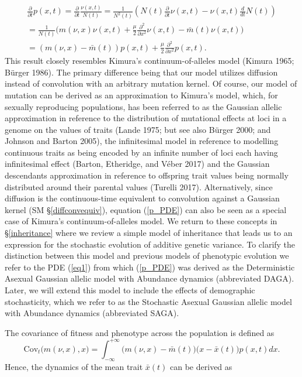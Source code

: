 \documentclass[]{article}
\begin{document}
\begin{multline}\label{p_PDE}
\frac{\partial}{\partial t}p(x,t)=\frac{\partial}{\partial t}\frac{\nu(x,t)}{N(t)}=\frac{1}{N^2(t)}\left(N(t)\frac{\partial}{\partial t}\nu(x,t)-\nu(x,t)\frac{d}{dt}N(t)\right) \\
=\frac{1}{N(t)}\Big(m(\nu,x)\nu(x,t)+\frac{\mu}{2}\frac{\partial^2}{\partial x^2}\nu(x,t)-\bar m(t)\nu(x,t)\Big) \\
=(m(\nu,x)-\bar m(t)) p(x,t)+\frac{\mu}{2}\frac{\partial^2}{\partial x^2}p(x,t).
\end{multline} This result closely resembles Kimura's
continuum-of-alleles model (Kimura 1965; Bürger 1986). The primary
difference being that our model utilizes diffusion instead of
convolution with an arbitrary mutation kernel. Of course, our model of
mutation can be derived as an approximation to Kimura's model, which,
for sexually reproducing populations, has been referred to as the
Gaussian allelic approximation in reference to the distribution of
mutational effects at loci in a genome on the values of traits (Lande
1975; but see also Bürger 2000; and Johnson and Barton 2005), the
infinitesimal model in reference to modelling continuous traits as being
encoded by an infinite number of loci each having infinitesimal effect
(Barton, Etheridge, and Véber 2017) and the Gaussian descendants
approximation in reference to offspring trait values being normally
distributed around their parental values (Turelli 2017). Alternatively,
since diffusion is the continuous-time equivalent to convolution against
a Gaussian kernel (SM \S\ref{diffconvequiv}), equation (\ref{p_PDE}) can
also be seen as a special case of Kimura's continuum-of-alleles model.
We return to these concepts in \S\ref{inheritance} where we review a
simple model of inheritance that leads us to an expression for the
stochastic evolution of additive genetic variance. To clarify the
distinction between this model and previous models of phenotypic
evolution we refer to the PDE (\ref{eq1}) from which (\ref{p_PDE}) was
derived as the Deterministic Asexual Gaussian allelic model with
Abundance dynamics (abbreviated DAGA). Later, we will extend this model
to include the effects of demographic stochasticity, which we refer to
as the Stochastic Asexual Gaussian allelic model with Abundance dynamics
(abbreviated SAGA).

The covariance of fitness and phenotype across the population is defined
as \begin{equation}
\mathrm{Cov}_t\Big(m(\nu,x),x\Big)=\int_{-\infty}^{+\infty}\Big(m(\nu,x)-\bar m(t)\Big)\Big(x-\bar x(t)\Big)p(x,t)dx.
\end{equation} Hence, the dynamics of the mean trait \(\bar x(t)\) can
be derived as
\end{document}
